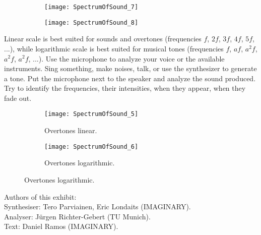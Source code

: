 \begin{figure}[h]
\centering
\begin{subfigure}{0.45\textwidth}
\centering
\texttt{[image: SpectrumOfSound\_7]}
\end{subfigure}
\begin{subfigure}{0.45\textwidth}
\centering
\texttt{[image: SpectrumOfSound\_8]}
\end{subfigure}
\end{figure}

Linear scale is best suited for sounds and overtones (frequencies $f$, $2f$, $3f$, $4f$, $5f$, ...), while logarithmic scale is best suited for musical tones (frequencies $f$, $af$, $a^2 f$, $a^2 f$, $a^2 f$, ...). Use the microphone to analyze your voice or the available instruments. Sing something, make noises, talk, or use the synthesizer to generate a tone. Put the microphone next to the speaker and analyze the sound produced. Try to identify the frequencies, their intensities, when they appear, when they fade out.


\begin{figure}[h]
\centering
\begin{subfigure}{0.45\textwidth}
\centering
\texttt{[image: SpectrumOfSound\_5]}
\caption*{Overtones linear.}
\end{subfigure}
\begin{subfigure}{0.45\textwidth}
\centering
\texttt{[image: SpectrumOfSound\_6]}
\caption*{Overtones logarithmic.}
\end{subfigure}
\end{figure}


\vfill

Authors of this exhibit: \\ 
Synthesiser: Tero Parviainen, Eric Londaits (IMAGINARY). \\
Analyser: Jürgen Richter-Gebert (TU Munich). \\
Text: Daniel Ramos (IMAGINARY).

